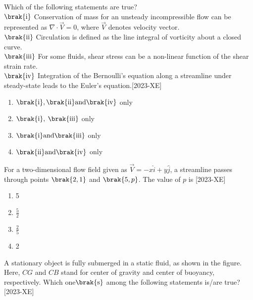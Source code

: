 \item Which of the following statements are true?\\
$\brak{\text{i}}$ Conservation of mass for an unsteady incompressible flow can be represented as $\nabla \cdot \overset{\rightarrow}{V}=0$, where $\overset{\rightarrow}{V}$ denotes velocity vector.\\
$\brak{\text{ii}}$ Circulation is defined as the line integral of vorticity about a closed curve.\\
$\brak{\text{iii}}$ For some fluids, shear stress can be a non-linear function of the shear strain rate.\\
$\brak{\text{iv}}$ Integration of the Bernoulli's equation along a streamline under steady-state leads to the Euler's equation.\hfill{[2023-XE]}\\
\begin{enumerate}
    \item $\brak{\text{i}},\brak{\text{ii}} \text{and} \brak{\text{iv}}$ only
    \item $\brak{\text{i}}, $  $\brak{\text{iii}}$ only
    \item $\brak{\text{i}} \text{and} \brak{\text{iii}}$ only
    \item $\brak{\text{ii}} \text{and} \brak{\text{iv}}$ only
\end{enumerate}
\item For a two-dimensional flow field given as $\overset{\rightarrow}{V}=-x \hat{i} + y \hat{j}$, a streamline passes through points $\brak{2,1}$ and $\brak{5,p}$. The value of $p$ is \hfill{[2023-XE]}\\
\begin{enumerate}
    \item 5\\
    \item $\frac{5}{2}$\\
    \item $\frac{2}{5}$\\
    \item 2
\end{enumerate}
\item A stationary object is fully submerged in a static fluid, as shown in the figure. Here, $CG$ and $CB$ stand for center of gravity and center of buoyancy, respectively. Which one$\brak{\text{s}}$ among the following statements is/are true?\hfill{[2023-XE]}\\
